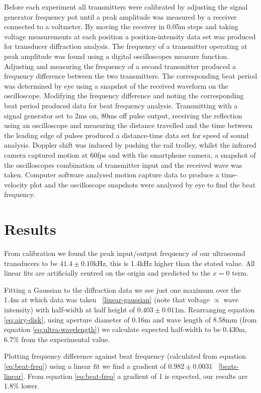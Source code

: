 \documentclass[a4paper,10pt,journal]{IEEEtran}
\newcommand{\figref}[2][\figurename~]{#1\ref{#2}}
\begin{document}
Before each experiment all transmitters were calibrated by adjusting the signal generator frequency pot until a peak amplitude was measured by a receiver connected to a voltmeter. By moving the receiver in 0.05m steps and taking voltage measurements at each position a position-intensity data set was produced for transducer diffraction analysis.
The frequency of a transmitter operating at peak amplitude was found using a digital oscilloscopes measure function. Adjusting and measuring the frequency of a second transmitter produced a frequency difference between the two transmitters. The corresponding beat period  was determined by eye using a snapshot of the received waveform on the oscilloscope. Modifying the frequency difference and noting the corresponding beat period produced data for beat frequency analysis.
Transmitting with a signal generator set to 2ms on, 80ms off pulse output, receiving the reflection using an oscilloscope and measuring the distance travelled and the time between the leading edge of pulses produced a distance-time data set for speed of sound analysis.
Doppler shift was induced by pushing the rail trolley, whilst the infrared camera captured motion at 60fps and with the smartphone camera, a snapshot of the oscilloscopes combination of transmitter input and the received wave was taken. Computer software analysed motion capture data to produce a time-velocity plot and the oscilloscope snapshots were analysed by eye to find the beat frequency.

\section{Results}

From calibration we found the peak input/output frequency of our ultrasound transducers to be $41.4 \pm 0.10$kHz, this is 1.4kHz higher than the stated value. All linear fits are artificially centred on the origin and predicted to the $x=0$ term.

Fitting a Gaussian to the diffraction data we see just one maximum over the 1.4m at which data was taken \figref{linear-gaussian} (note that voltage $\propto$ wave intensity) with half-width at half height of $0.403 \pm 0.011$m. Rearranging equation \eqref{eq:airy-disk}, using aperture diameter of 0.16m and wave length of 8.58mm (from equation \eqref{eq:ultra-wavelength}) we calculate expected half-width to be 0.430m, 6.7\% from the experimental value.

Plotting frequency difference against beat frequency (calculated from equation \eqref{eq:beat-freq}) using a linear fit we find a gradient of $0.982 \pm 0.0031$ \figref{beats-linear}. From equation \eqref{eq:beat-freq} a gradient of 1 is expected, our results are 1.8\% lower.
\end{document}
